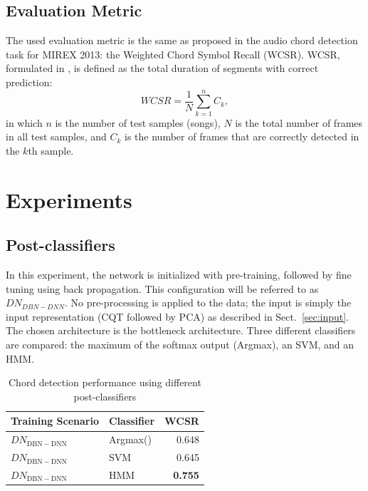 \documentclass{article}
\begin{document}
\subsection{Evaluation Metric}
The used evaluation metric is the same as proposed in the audio chord detection task for MIREX 2013: the Weighted Chord Symbol Recall (WCSR). WCSR, formulated in , is defined as the total duration of segments with correct prediction:   
\begin{equation}\label{csr}
WCSR = \frac{1}{N} \sum_{k=1}^n C_{k},
\end{equation}
in which $n$ is the number of test samples (songs), $N$ is the total number of frames in all test samples, and $C_{k}$ is the number of frames that are correctly detected in the $k$th sample. 

\section{Experiments}

\subsection{Post-classifiers}
In this experiment, the network is initialized with pre-training, followed by fine tuning using back propagation. This configuration will be referred to as $DN_{DBN-DNN}$.
No pre-processing is applied to the data; the input is simply the input representation (CQT followed by PCA) as described in Sect.~\ref{sec:input}. The chosen architecture is the bottleneck architecture. 
Three different classifiers are compared: the maximum of the softmax output (Argmax), an SVM, and an HMM. 
\begin{table}
\centering
\begin{tabular*}{\columnwidth}{@{\extracolsep{\fill}}llr}
\toprule
\textbf{Training Scenario} & \textbf{Classifier} & \textbf{WCSR}  \\ \hline

$DN_\mathrm{DBN-DNN}$         & Argmax()            & 0.648 \\ 
$DN_\mathrm{DBN-DNN}$          & SVM            & 0.645 \\ 
$DN_\mathrm{DBN-DNN}$         &  HMM           & \textbf{0.755} \\ \bottomrule
\end{tabular*}
\caption{Chord detection performance using different post-classifiers}
\label{tab:dbn-dnn}
\end{table}
\end{document}
